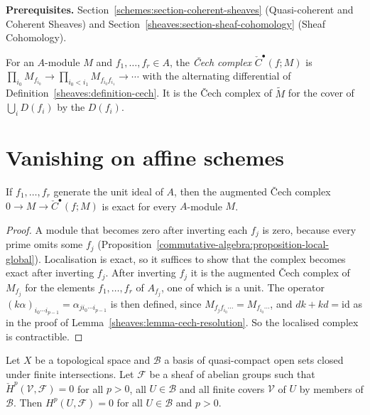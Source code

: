 \noindent\textbf{Prerequisites.} Section~\ref{schemes:section-coherent-sheaves} (Quasi-coherent and Coherent Sheaves) and Section~\ref{sheaves:section-sheaf-cohomology}
(Sheaf Cohomology).

For an $A$-module $M$ and $f_1, \ldots, f_r \in A$, the \emph{\v{C}ech complex} $\check C^\bullet(f; M)$ is
$\prod_{i_0}M_{f_{i_0}} \to \prod_{i_0 < i_1}M_{f_{i_0}f_{i_1}} \to \cdots$ with the alternating differential of
Definition~\ref{sheaves:definition-cech}. It is the \v{C}ech complex of $\widetilde M$ for the cover of $\bigcup_iD(f_i)$ by the $D(f_i)$.

\section{Vanishing on affine schemes}\label{schemes:section-affine}

\begin{lemma}\label{schemes:lemma-cech-exact}
If $f_1, \ldots, f_r$ generate the unit ideal of $A$, then the augmented \v{C}ech complex $0 \to M \to \check C^\bullet(f; M)$ is exact for every $A$-module $M$.
\end{lemma}

\begin{proof}
A module that becomes zero after inverting each $f_j$ is zero, because every prime omits some $f_j$
(Proposition~\ref{commutative-algebra:proposition-local-global}). Localisation is exact, so it suffices to show that the complex becomes exact after
inverting $f_j$. After inverting $f_j$ it is the augmented \v{C}ech complex of $M_{f_j}$ for the elements $f_1, \ldots, f_r$ of $A_{f_j}$, one of which is a unit.
The operator $(k\alpha)_{i_0 \cdots i_{p-1}} = \alpha_{ji_0 \cdots i_{p-1}}$ is then defined, since $M_{f_jf_{i_0} \cdots} = M_{f_{i_0} \cdots}$, and
$dk + kd = \mathrm{id}$ as in the proof of Lemma~\ref{sheaves:lemma-cech-resolution}. So the localised complex is contractible.
\end{proof}

\begin{lemma}[Cartan]\label{schemes:lemma-cartan}
Let $X$ be a topological space and $\mathcal{B}$ a basis of quasi-compact open sets closed under finite intersections. Let $\mathcal{F}$ be a sheaf of
abelian groups such that $\check H^p(\mathcal{V}, \mathcal{F}) = 0$ for all $p > 0$, all $U \in \mathcal{B}$ and all finite covers $\mathcal{V}$ of $U$ by members of
$\mathcal{B}$. Then $H^p(U, \mathcal{F}) = 0$ for all $U \in \mathcal{B}$ and $p > 0$.
\end{lemma}

